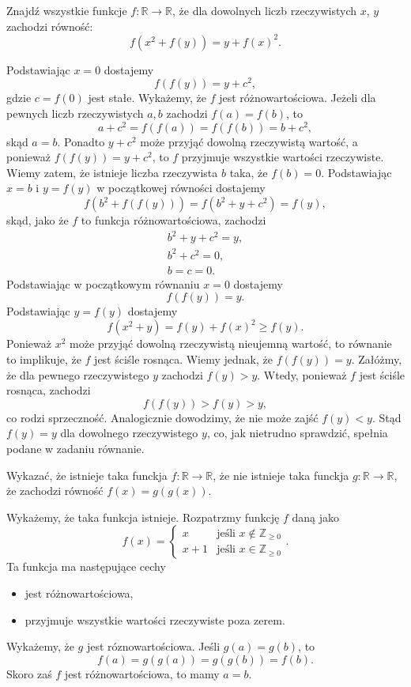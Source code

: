 \begin{problem}{5}
	Znajdź wszystkie funkcje $f:\mathbb{R}\longrightarrow\mathbb{R}$, że dla dowolnych liczb rzeczywistych $x$, $y$ zachodzi równość:
	\[
		f(x^2 + f(y)) = y + f(x)^2.
	\]
\end{problem}


\noindent
Podstawiając $x = 0$ dostajemy 
\[
	f(f(y)) = y + c^2,
\] 
gdzie $c = f(0)$ jest stałe. Wykażemy, że $f$ jest różnowartościowa. Jeżeli dla pewnych liczb rzeczywistych $a, b$ zachodzi $f(a) = f(b)$, to 
\[
	a+c^2 = f(f(a)) = f(f(b)) = b+c^2,
\]
skąd $a = b$.
Ponadto $y + c^2$ może przyjąć dowolną rzeczywistą wartość, a ponieważ $f(f(y)) = y + c^2$, to $f$ przyjmuje wszystkie wartości rzeczywiste.
Wiemy zatem, że istnieje liczba rzeczywista $b$ taka, że $f(b) = 0$. Podstawiając $x = b$ i $y = f(y)$ w początkowej równości dostajemy 
\[
	f(b^2 + f(f(y))) = f(b^2 + y + c^2) = f(y),
\]
skąd, jako że $f$ to funkcja różnowartościowa, zachodzi 
\begin{align*}
	b^2 + y + c^2 = y, \\
	b^2 + c^2 = 0, \\
	b = c = 0.
\end{align*}
Podstawiając w początkowym równaniu $x = 0$ dostajemy 
\[
	f(f(y)) = y.
\] 
Podstawiając $y = f(y)$  dostajemy 
\[
	f(x^2 + y) = f(y) + f(x)^2 \geqslant f(y).
\]
Ponieważ $x^2$ może przyjąć dowolną rzeczywistą nieujemną wartość, to równanie to implikuje, że $f$ jest ściśle rosnąca. Wiemy jednak, że $f(f(y)) = y$. Załóżmy, że dla pewnego rzeczywistego $y$ zachodzi $f(y) > y$. Wtedy, ponieważ $f$ jest ściśle rosnąca,
zachodzi 
\[
	f(f(y)) > f(y) > y,
\] 
co rodzi sprzeczność. Analogicznie dowodzimy, że nie może zajść $f(y) < y$. Stąd $f(y) = y$ dla dowolnego rzeczywistego $y$, co, jak nietrudno sprawdzić, spełnia podane w zadaniu równanie.

\vspace{10px}

\begin{problem}{6}
	Wykazać, że istnieje taka funckja $f:\mathbb{R}\longrightarrow\mathbb{R}$, że nie istnieje taka funckja $g:\mathbb{R}\longrightarrow\mathbb{R}$, że zachodzi równość $f(x) = g(g(x))$.
\end{problem}

\noindent
Wykażemy, że taka funkcja istnieje. Rozpatrzmy funkcję $f$ daną jako
\[
	f(x) = 	\begin{cases} 
				x &\mbox{jeśli } x \notin \mathbb{Z}_{\geqslant 0} \\ 
				x + 1 & \mbox{jeśli } x \in \mathbb{Z}_{\geqslant 0}
			\end{cases}.
\]
Ta funkcja ma następujące cechy
\begin{itemize}
	\item jest różnowartościowa,
	\item przyjmuje wszystkie wartości rzeczywiste poza zerem.
\end{itemize}
Wykażemy, że $g$ jest róznowartościowa. Jeśli $g(a) = g(b)$, to
\[
	f(a) = g(g(a)) = g(g(b)) = f(b).
\]
Skoro zaś $f$ jest różnowartościowa, to mamy $a = b$.

